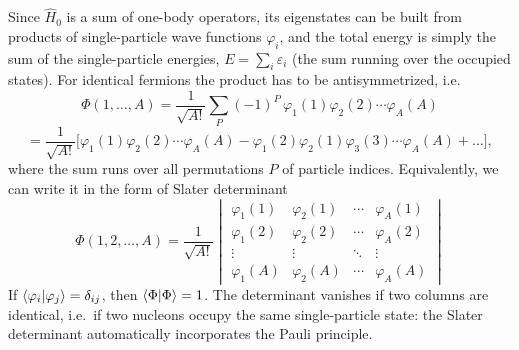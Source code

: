 \documentclass[11pt,a4paper]{article}
\newcommand{\op}[1]{\hat{#1}}
\begin{document}
Since $\op H_0$ is a sum of one-body operators, its eigenstates can be built from products of single-particle wave functions $\varphi_i$, and the total energy is simply the sum of the single-particle energies, $E=\sum_{i}\varepsilon_i$ (the sum running over the occupied states). For identical fermions the product has to be antisymmetrized, i.e. 
\[
\Phi(1,\dots,A)=\frac{1}{\sqrt{A!}}\sum_P(-1)^P\,\varphi_1(1)\varphi_2(2)\cdots\varphi_A(A)
\]
\[
=\frac{1}{\sqrt{A!}}\Big[\varphi_1(1)\varphi_2(2)\cdots\varphi_A(A)-\varphi_1(2)\varphi_2(1)\varphi_3(3)\cdots\varphi_A(A)+\dots\Big],
\]
where the sum runs over all permutations $P$ of particle indices. Equivalently, we can write it in the form of Slater determinant
\[
\Phi(1,2,\dots,A)=\frac{1}{\sqrt{A!}}
\begin{vmatrix}
\varphi_1(1)&\varphi_2(1)&\cdots&\varphi_A(1)\\
\varphi_1(2)&\varphi_2(2)&\cdots&\varphi_A(2)\\
\vdots&\vdots&\ddots&\vdots\\
\varphi_1(A)&\varphi_2(A)&\cdots&\varphi_A(A)
\end{vmatrix}
\]
If $\braket{\varphi_i|\varphi_j}=\delta_{ij}$, then $\braket{\Phi|\Phi}=1$.
The determinant vanishes if two columns are identical, i.e.\ if two nucleons occupy the same single-particle state: the Slater determinant automatically incorporates the Pauli principle. 
\end{document}

